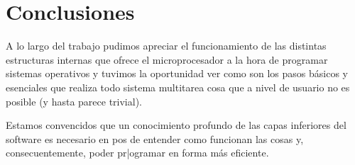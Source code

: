 \section{Conclusiones}

A lo largo del trabajo pudimos apreciar el funcionamiento de las distintas estructuras internas que ofrece el microprocesador a la hora de programar sistemas operativos y tuvimos la oportunidad ver como son los pasos básicos y esenciales que realiza todo sistema multitarea cosa que a nivel de usuario no es posible (y hasta parece trivial). 

Estamos convencidos que un conocimiento profundo de las capas inferiores del software es necesario en pos de entender como funcionan las cosas y, consecuentemente, poder pr|ogramar en forma más eficiente.